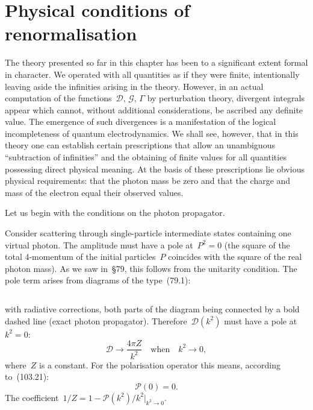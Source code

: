 
\section{Physical conditions of renormalisation}


The theory presented so far in this chapter has been to a significant extent formal in character. We operated with all quantities as if they were finite, intentionally leaving aside the infinities arising in the theory. However, in an actual computation of the functions~$\mathcal{D}$, $\mathcal{G}$, $\Gamma$ by perturbation theory, divergent integrals appear which cannot, without additional considerations, be ascribed any definite value. The emergence of such divergences is a manifestation of the logical incompleteness of quantum electrodynamics. We shall see, however, that in this theory one can establish certain prescriptions that allow an unambiguous ``subtraction of infinities'' and the obtaining of finite values for all quantities possessing direct physical meaning. At the basis of these prescriptions lie obvious physical requirements: that the photon mass be zero and that the charge and mass of the electron equal their observed values.

Let us begin with the conditions on the photon propagator.

Consider scattering through single-particle intermediate states containing one virtual photon. The amplitude must have a pole at~$P^2 = 0$ (the square of the total 4-momentum of the initial particles~$P$ coincides with the square of the real photon mass). As we saw in~\S79, this follows from the unitarity condition. The pole term arises from diagrams of the type~(79.1):

\begin{equation}
\label{eq:110.1}
\end{equation}

\noindent with radiative corrections, both parts of the diagram being connected by a bold dashed line (exact photon propagator). Therefore~$\mathcal{D}(k^2)$ must have a pole at~$k^2 = 0$:
\begin{equation}
\mathcal{D} \to \frac{4\pi Z}{k^2} \quad \text{when} \quad k^2 \to 0,
\label{eq:110.2}
\end{equation}
where~$Z$ is a constant. For the polarisation operator this means, according to~(103.21):
\begin{equation}
\mathcal{P}(0) = 0.
\label{eq:110.3}
\end{equation}
The coefficient~$1/Z = 1 - \mathcal{P}(k^2)/k^2\big|_{k^2 \to 0}$.

